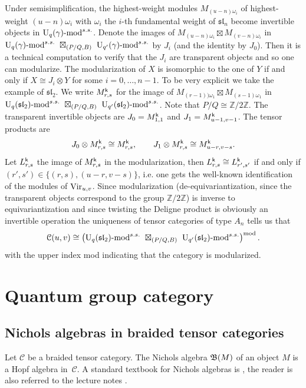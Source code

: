 \documentclass[a4paper, reqno]{amsart}
\theoremstyle{introTheorems}
\newcommand\cC{\mathcal{C}}
\newcommand\Vir{\textup{Vir}}
\newcommand\g\gamma
\renewcommand{\1}{\mathbbold{1}}
\begin{document}
Under semisimplification, the highest-weight modules $M_{(u-n)\omega_i}$ of highest-weight
$(u-n)\omega_i$ with $\omega_i$ the $i$-th fundamental weight of $\mathfrak{sl}_n$ become invertible objects in  $\Uq(\g)\textup{-mod}^{s.s.}$. Denote the images of $M_{(u-n)\omega_i} \boxtimes M_{(v-n)\omega_i}$ in $\Uq(\g)\textup{-mod}^{s.s.} \ \boxtimes_{(P/Q, B)} \ \mathrm{U}_{q'}(\g)\textup{-mod}^{s.s.}$ by $J_i$ (and the identity by $J_0$). Then it is a technical computation to verify that the $J_i$ are transparent objects and so one can modularize. The modularization of $X$ is isomorphic to the one of $Y$ if and only if $X \cong J_i \otimes Y$ for some $i = 0, \dots, n-1$. To be very explicit we take the example of $\mathfrak{sl}_2$. We write $M^{\mathsf{k}}_{r, s}$ for the image of 
$M_{(r-1))\omega_1} \boxtimes M_{(s-1)\omega_1}$ in $\Uq(\mathfrak{sl}_2)\textup{-mod}^{s.s.} \ \boxtimes_{(P/Q, B)} \ \mathrm{U}_{q'}(\mathfrak{sl}_2)\textup{-mod}^{s.s.}$. Note that $P/Q \cong \mathbb Z/2\mathbb Z$. The transparent invertible objects are $J_0 = M^{\mathsf{k}}_{1, 1}$ and $J_1 = M^{\mathsf{k}}_{u-1, v-1}$. The tensor products  are
\[
J_0 \otimes M^{\mathsf{k}}_{r, s} \cong M^{\mathsf{k}}_{r, s}, \qquad 
J_1 \otimes M^{\mathsf{k}}_{r, s} \cong M^{\mathsf{k}}_{u-r, v-s}.
\]
Let $L^{\mathsf{k}}_{r, s}$ the image of $M^{\mathsf{k}}_{r, s}$ in the modularization, then 
$L^{\mathsf{k}}_{r, s} \cong L^{\mathsf{k}}_{r', s'}$ if and only if $(r', s') \in  \{ (r, s), (u-r, v-s)\}$, i.e. one gets the well-known identification of the modules of $\Vir_{u,v}$.
Since modularization  (de-equivariantization, since the transparent objects correspond to the group $\mathbb Z/2\mathbb Z$) is inverse to equivariantization and since twisting the Deligne product is obviously an invertible operation the uniqueness of tensor categories of type $A_n$ tells us that 
\[
\cC(u,v) \cong  \left(\Uq(\mathfrak{sl}_2)\textup{-mod}^{s.s.} \ \boxtimes_{(P/Q, B)} \ \mathrm{U}_{q'}(\mathfrak{sl}_2)\textup{-mod}^{s.s.}\right)^{\textup{mod}}.
\]
with the upper index mod indicating that the category is modularized.  


\section{Quantum group category}\label{sec:QuantumGroup}

\subsection{Nichols algebras in braided tensor categories}\label{subsec:introNichols}

Let $\cC$ be a braided tensor category. The Nichols algebra $\mathfrak{B}(M)$ of an object $M$ is a Hopf algebra in~$\cC$.  A standard textbook for Nichols algebras is \cite{HS20}, the reader is also referred to the lecture notes \cite{Len26}. 
\end{document}

